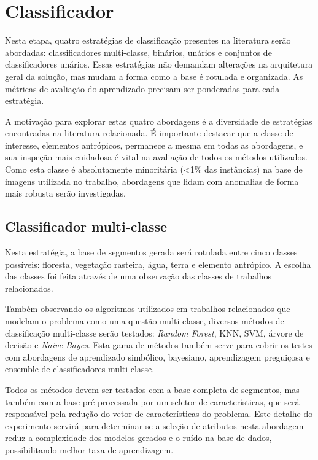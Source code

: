 \section{Classificador}\label{sec:metClassificador}

Nesta etapa, quatro estratégias de classificação presentes na literatura serão abordadas: classificadores multi-classe, binários, unários e conjuntos de classificadores unários. Essas estratégias não demandam alterações na arquitetura geral da solução, mas mudam a forma como a base é rotulada e organizada. As métricas de avaliação do aprendizado precisam ser ponderadas para cada estratégia.

A motivação para explorar estas quatro abordagens é a diversidade de estratégias encontradas na literatura relacionada. É importante destacar que a classe de interesse, elementos antrópicos, permanece a mesma em todas as abordagens, e sua inspeção mais cuidadosa é vital na avaliação de todos os métodos utilizados. Como esta classe é absolutamente minoritária (<1\% das instâncias) na base de imagens utilizada no trabalho, abordagens que lidam com anomalias de forma mais robusta serão investigadas.

\subsection{Classificador multi-classe}

Nesta estratégia, a base de segmentos gerada será rotulada entre cinco classes possíveis: floresta, vegetação rasteira, água, terra e elemento antrópico. A escolha das classes foi feita através de uma observação das classes de trabalhos relacionados.

Também observando os algoritmos utilizados em trabalhos relacionados que modelam o problema como uma questão multi-classe, diversos métodos de classificação multi-classe serão testados: \textit{Random Forest}, KNN, SVM, árvore de decisão e \textit{Naive Bayes}. Esta gama de métodos também serve para cobrir os testes com abordagens de aprendizado simbólico, bayesiano, aprendizagem preguiçosa e ensemble de classificadores multi-classe.

Todos os métodos devem ser testados com a base completa de segmentos, mas também com a base pré-processada por um seletor de características, que será responsável pela redução do vetor de características do problema. Este detalhe do experimento servirá para determinar se a seleção de atributos nesta abordagem reduz a complexidade dos modelos gerados e o ruído na base de dados, possibilitando melhor taxa de aprendizagem.

